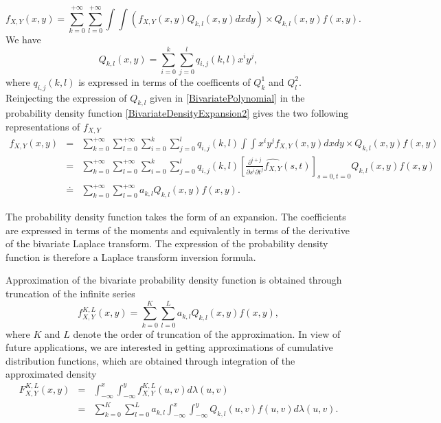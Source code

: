 \begin{equation}\label{BivariateDensityExpansion2}
f_{X,Y}(x,y)=\sum_{k=0}^{+\infty}\sum_{l=0}^{+\infty}\int\int \left(f_{X,Y}(x,y)Q_{k,l}(x,y)dxdy\right)\times Q_{k,l}(x,y)f(x,y).
\end{equation}
We have
\begin{equation}\label{BivariatePolynomial}
Q_{k,l}(x,y)=\sum_{i=0}^{k}\sum_{j=0}^{l}q_{i,j}(k,l)x^{i}y^{j},
\end{equation}
 where $q_{i,j}(k,l)$ is expressed in terms of the coefficents of $Q_{k}^{1}$ and $Q_{l}^{2}$. Reinjecting the expression of $Q_{k,l}$ given in \eqref{BivariatePolynomial} in the probability density function \eqref{BivariateDensityExpansion2} gives the two following representations of $f_{X,Y}$
\begin{eqnarray}\label{BivariateDensityExpansion3}
f_{X,Y}(x,y)&=&\sum_{k=0}^{+\infty}\sum_{l=0}^{+\infty}\sum_{i=0}^{k}\sum_{j=0}^{l}q_{i,j}(k,l)\int\int x^{i}y^{j}f_{X,Y}(x,y)dxdy\times Q_{k,l}(x,y)f(x,y)\nonumber\\
&=&\sum_{k=0}^{+\infty}\sum_{l=0}^{+\infty}\sum_{i=0}^{k}\sum_{j=0}^{l}q_{i,j}(k,l)\left[\frac{\partial^{i+j}}{\partial s^{i}\partial t^{j}}\widehat{f_{X,Y}}(s,t)\right]_{s=0,t=0}Q_{k,l}(x,y)f(x,y)\nonumber\\
&\doteq&\sum_{k=0}^{+\infty}\sum_{l=0}^{+\infty}a_{k,l} Q_{k,l}(x,y)f(x,y).\nonumber
\end{eqnarray}
\begin{Rk}
The probability density function takes the form of an expansion. The coefficients are expressed in terms of the moments and equivalently in terms of the derivative of the bivariate Laplace transform. The expression of the probability density function is therefore a Laplace transform inversion formula.
\end{Rk}
Approximation of the bivariate probability density function is obtained through truncation of the infinite series
\begin{equation}
f^{K,L}_{X,Y}(x,y)=\sum_{k=0}^{K}\sum_{l=0}^{L}a_{k,l} Q_{k,l}(x,y)f(x,y)\nonumber,
\end{equation}
where $K$ and $L$ denote the order of truncation of the approximation. In view of future applications, we are interested in getting approximations of cumulative distribution functions, which are obtained through integration of the approximated density
\begin{eqnarray}
F_{X,Y}^{K,L}(x,y)&=&\int_{-\infty}^{x}\int_{-\infty}^{y}f^{K,L}_{X,Y}(u,v)d\lambda(u,v)\\
&=&\sum_{k=0}^{K}\sum_{l=0}^{L}a_{k,l}\int_{-\infty}^{x}\int_{-\infty}^{y} Q_{k,l}(u,v)f(u,v)d\lambda(u,v).
\end{eqnarray}
